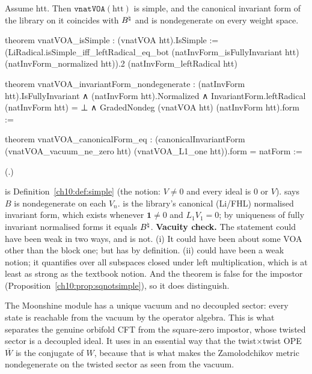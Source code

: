 \begin{theorem}\label{ch10:thm:simple}
Assume htt.  Then $\mathtt{vnatVOA}(\mathrm{htt})$ is simple, and the canonical invariant form of the
library on it coincides with $B^{\natural}$ and is nondegenerate on every weight space.
\end{theorem}
\begin{leancode}
theorem vnatVOA_isSimple : (vnatVOA htt).IsSimple :=
  (LiRadical.isSimple_iff_leftRadical_eq_bot (natInvForm_isFullyInvariant htt)
    (natInvForm_normalized htt)).2 (natInvForm_leftRadical htt)

theorem vnatVOA_invariantForm_nondegenerate :
    (natInvForm htt).IsFullyInvariant ∧ (natInvForm htt).Normalized ∧
      InvariantForm.leftRadical (natInvForm htt) = ⊥ ∧
        GradedNondeg (vnatVOA htt) (natInvForm htt).form :=

theorem vnatVOA_canonicalForm_eq :
    (canonicalInvariantForm (vnatVOA_vacuum_ne_zero htt) (vnatVOA_L1_one htt)).form = natForm :=
\end{leancode}
(.)
\begin{dictionary}
 is Definition~\ref{ch10:def:simple} (the  notion: $V\ne0$
and every ideal is $0$ or $V$).   says $B$ is nondegenerate on each
$V_n$.   is the library's canonical (Li/FHL) normalised invariant
form, which exists whenever $\mathbf 1\ne0$ and $L_1V_1=0$; by uniqueness of fully invariant
normalised forms it equals $B^{\natural}$.  \textbf{Vacuity check.}  The statement could have been
weak in two ways, and is not.  (i) It could have been about some VOA other than the block one;
but  has  by definition.  (ii)  could have been a
weak notion; it quantifies over all subspaces closed under left multiplication, which is at least
as strong as the textbook notion.  And the theorem is false for the impostor
(Proposition~\ref{ch10:prop:sqnotsimple}), so it does distinguish.
\end{dictionary}

\begin{physics}
The Moonshine module has a unique vacuum and no decoupled sector: every state is reachable from the vacuum by the operator algebra. This is what separates the genuine orbifold CFT from the square-zero impostor, whose twisted sector is a decoupled ideal. It uses in an essential way that the twist$\times$twist OPE $\overline W$ is the conjugate of $W$, because that is what makes the Zamolodchikov metric nondegenerate on the twisted sector as seen from the vacuum.
\end{physics}

